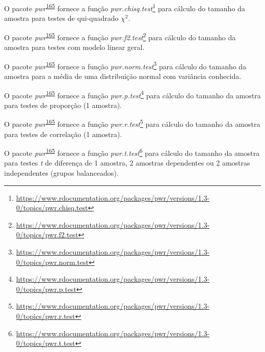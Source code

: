 \documentclass[
  a4paper,
]{book}
\renewcommand{\href}[2]{#2\footnote{\url{#1}}}
\newenvironment{infobox}[1]
  {
  \begin{itemize}
  \renewcommand{\labelitemi}{
    \raisebox{-.7\height}[0pt][0pt]{
      {\setkeys{Gin}{width=3em,keepaspectratio}
        \texttt{[image: \#1]}}
    }
  }
  \setlength{\fboxsep}{1em}
  \begin{blackbox}
  \item
  }
  {
  \end{blackbox}
  \end{itemize}
  }
\begin{document}
\begin{infobox}{images/Rlogo}
O pacote \emph{pwr}\textsuperscript{\protect\hyperlink{ref-pwr}{165}} fornece a função \href{https://www.rdocumentation.org/packages/pwr/versions/1.3-0/topics/pwr.chisq.test}{\emph{pwr.chisq.test}} para cálculo do tamanho da amostra para testes de qui-quadrado \(\chi^2\).

\end{infobox}

\begin{infobox}{images/Rlogo}
O pacote \emph{pwr}\textsuperscript{\protect\hyperlink{ref-pwr}{165}} fornece a função \href{https://www.rdocumentation.org/packages/pwr/versions/1.3-0/topics/pwr.f2.test}{\emph{pwr.f2.test}} para cálculo do tamanho da amostra para testes com modelo linear geral.

\end{infobox}

\begin{infobox}{images/Rlogo}
O pacote \emph{pwr}\textsuperscript{\protect\hyperlink{ref-pwr}{165}} fornece a função \href{https://www.rdocumentation.org/packages/pwr/versions/1.3-0/topics/pwr.norm.test}{\emph{pwr.norm.test}} para cálculo do tamanho da amostra para a média de uma distribuição normal com variância conhecida.

\end{infobox}

\begin{infobox}{images/Rlogo}
O pacote \emph{pwr}\textsuperscript{\protect\hyperlink{ref-pwr}{165}} fornece a função \href{https://www.rdocumentation.org/packages/pwr/versions/1.3-0/topics/pwr.p.test}{\emph{pwr.p.test}} para cálculo do tamanho da amostra para testes de proporção (1 amostra).

\end{infobox}

\begin{infobox}{images/Rlogo}
O pacote \emph{pwr}\textsuperscript{\protect\hyperlink{ref-pwr}{165}} fornece a função \href{https://www.rdocumentation.org/packages/pwr/versions/1.3-0/topics/pwr.r.test}{\emph{pwr.r.test}} para cálculo do tamanho da amostra para testes de correlação (1 amostra).

\end{infobox}

\begin{infobox}{images/Rlogo}
O pacote \emph{pwr}\textsuperscript{\protect\hyperlink{ref-pwr}{165}} fornece a função \href{https://www.rdocumentation.org/packages/pwr/versions/1.3-0/topics/pwr.t.test}{\emph{pwr.t.test}} para cálculo do tamanho da amostra para testes \emph{t} de diferença de 1 amostra, 2 amostras dependentes ou 2 amostras independentes (grupos balanceados).

\end{infobox}
\end{document}
